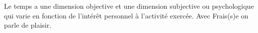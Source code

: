 %
    {Le temps a une dimension objective et une dimension subjective ou psychologique qui varie en fonction de l’intérêt personnel à l’activité exercée.}%
    {Avec Frais(s)e on parle de plaisir.}
